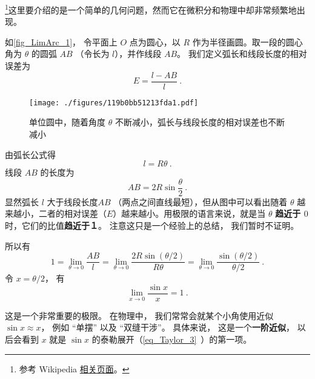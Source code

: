 

\footnote{参考 Wikipedia \href{https://en.wikipedia.org/wiki/Small-angle_approximation}{相关页面}。}这里要介绍的是一个简单的几何问题，然而它在微积分和物理中却非常频繁地出现。

如\autoref{fig_LimArc_1}， 令平面上 $O$ 点为圆心，以 $R$ 作为半径画圆。取一段的圆心角为 $\theta $ 的圆弧 $AB$ （令长为 $l$），并作线段 $AB$。 我们定义弧长和线段长度的相对误差为
\begin{equation}
E = \frac{l - AB}{l}~.
\end{equation}

\begin{figure}[ht]
\centering
\texttt{[image: ./figures/119b0bb51213fda1.pdf]}
\caption{单位圆中，随着角度 $\theta$ 不断减小，弧长与线段长度的相对误差也不断减小}\label{fig_LimArc_1}
\end{figure}

由弧长公式得
\begin{equation} \label{eq_LimArc_1}
l = R\theta ~.
\end{equation}
线段 $AB$ 的长度为
\begin{equation}\label{eq_LimArc_2}
AB = 2R\sin \frac{\theta }{2}~.
\end{equation}
显然弧长 $l$ 大于线段长度$AB$ （两点之间直线最短），但从图中可以看出随着 $\theta $ 越来越小，二者的相对误差（$E$）越来越小。用极限的语言来说，就是当 $\theta $ \textbf{趋近于 $0$ } 时，它们的比值\textbf{趋近于１}。 注意这只是一个经验上的总结， 我们暂时不证明。

所以有
\begin{equation}
1=\lim_{\theta\to 0} \frac{AB}{l} = \lim_{\theta\to 0} \frac{2R\sin (\theta/2)}{R\theta} 
= \lim_{\theta\to 0}\frac{\sin (\theta/2)}{\theta/2}~.
\end{equation}
令 $x = \theta/2$， 有
\begin{equation}
\lim_{x\to 0} \frac{\sin x}{x} = 1~.
\end{equation}

这是一个非常重要的极限。 在物理中， 我们常常会就某个小角使用近似 $\sin x \approx x$， 例如 “单摆” 以及 “双缝干涉”。 具体来说， 这是一个\textbf{一阶近似}，  以后会看到 $x$ 就是 $\sin x$ 的泰勒展开（\autoref{eq_Taylor_3}~）的第一项。

